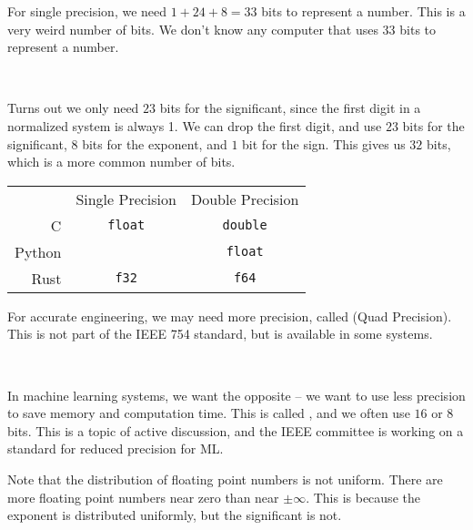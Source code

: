 \begin{remark}
    For single precision, we need \( 1 + 24 + 8 = 33 \) bits to represent a number. This is a very weird number of bits. We don't know any computer that uses 33 bits to represent a number.

        {~~~}

    Turns out we only need \( 23 \) bits for the significant, since the first digit in a normalized system is always 1. We can drop the first digit, and use \( 23 \) bits for the significant, \( 8 \) bits for the exponent, and \( 1 \) bit for the sign. This gives us \( 32 \) bits, which is a more common number of bits.
\end{remark}

\begin{note}
    \vspace{-1em}
    \begin{table}[H]
        \centering
        \begin{tabular}{rcc}
                   & Single Precision & Double Precision \\
            C      & \texttt{float}   & \texttt{double}  \\
            Python &                  & \texttt{float}   \\
            Rust   & \texttt{f32}     & \texttt{f64}
        \end{tabular}
    \end{table}
\end{note}

\begin{note}
    For accurate engineering, we may need more precision, called  (Quad Precision). This is not part of the IEEE 754 standard, but is available in some systems.

        {~~~}

    In machine learning systems, we want the opposite -- we want to use less precision to save memory and computation time. This is called , and we often use \( 16 \) or \( 8 \) bits. This is a topic of active discussion, and the IEEE committee is working on a standard for reduced precision for ML.
\end{note}

Note that the distribution of floating point numbers is not uniform. There are more floating point numbers near zero than near \( \pm \infty \). This is because the exponent is distributed uniformly, but the significant is not.

